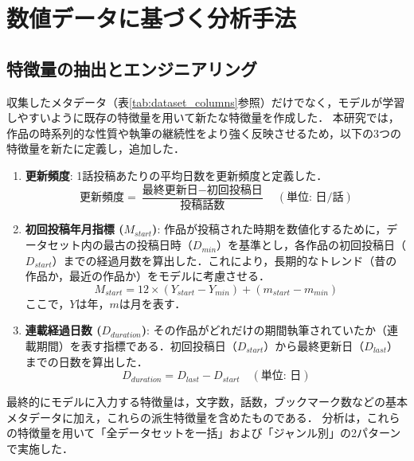 \documentclass[uplatex, dvipdfmx, 11pt, a4paper, report]{jsbook}
\begin{document}
\section{数値データに基づく分析手法}

\subsection{特徴量の抽出とエンジニアリング}
収集したメタデータ（表\ref{tab:dataset_columns}参照）だけでなく，モデルが学習しやすいように既存の特徴量を用いて新たな特徴量を作成した．
本研究では，作品の時系列的な性質や執筆の継続性をより強く反映させるため，以下の3つの特徴量を新たに定義し，追加した．

\begin{enumerate}
  \item \textbf{更新頻度}: 
  1話投稿あたりの平均日数を更新頻度と定義した．
  \begin{equation}
    \text{更新頻度} = \frac{\text{最終更新日} - \text{初回投稿日}}{\text{投稿話数}} \quad (\text{単位: 日/話})
  \end{equation}

  \item \textbf{初回投稿年月指標 ($M_{start}$)}: 
  作品が投稿された時期を数値化するために，データセット内の最古の投稿日時（$D_{min}$）を基準とし，各作品の初回投稿日（$D_{start}$）までの経過月数を算出した．これにより，長期的なトレンド（昔の作品か，最近の作品か）をモデルに考慮させる．
  \begin{equation}
    M_{start} = 12 \times (Y_{start} - Y_{min}) + (m_{start} - m_{min})
  \end{equation}
  ここで，$Y$は年，$m$は月を表す．

  \item \textbf{連載経過日数 ($D_{duration}$)}: 
  その作品がどれだけの期間執筆されていたか（連載期間）を表す指標である．初回投稿日（$D_{start}$）から最終更新日（$D_{last}$）までの日数を算出した．
  \begin{equation}
    D_{duration} = D_{last} - D_{start} \quad (\text{単位: 日})
  \end{equation}
\end{enumerate}

最終的にモデルに入力する特徴量は，文字数，話数，ブックマーク数などの基本メタデータに加え，これらの派生特徴量を含めたものである．
分析は，これらの特徴量を用いて「全データセットを一括」および「ジャンル別」の2パターンで実施した．
\end{document}
